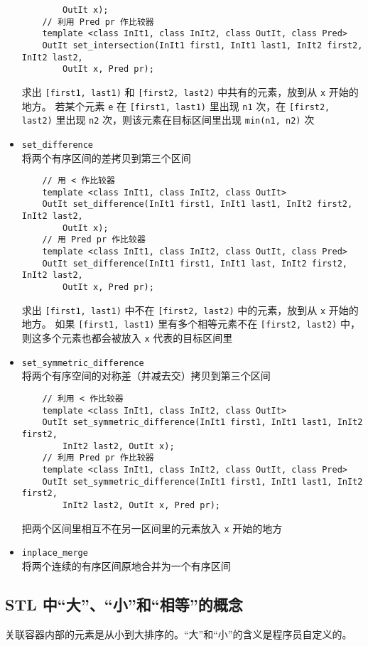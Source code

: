 \documentclass[UTF8]{ctexart}
\begin{document}
\begin{itemize}
\begin{verbatim}
        OutIt x);
    // 利用 Pred pr 作比较器
    template <class InIt1, class InIt2, class OutIt, class Pred>
    OutIt set_intersection(InIt1 first1, InIt1 last1, InIt2 first2, InIt2 last2,
        OutIt x, Pred pr);
    \end{verbatim}
    求出 \texttt{[first1, last1)} 和 \texttt{[first2, last2)} 中共有的元素，放到从 \texttt{x} 开始的地方。
    若某个元素 \texttt{e} 在 \texttt{[first1, last1)} 里出现 \texttt{n1} 次，在 \texttt{[first2, last2)}
    里出现 \texttt{n2} 次，则该元素在目标区间里出现 \texttt{min(n1, n2)} 次
    \item \texttt{set\_difference} \\
    将两个有序区间的差拷贝到第三个区间
    \begin{verbatim}
    // 用 < 作比较器
    template <class InIt1, class InIt2, class OutIt>
    OutIt set_difference(InIt1 first1, InIt1 last1, InIt2 first2, InIt2 last2,
        OutIt x);
    // 用 Pred pr 作比较器
    template <class InIt1, class InIt2, class OutIt, class Pred>
    OutIt set_difference(InIt1 first1, InIt1 last, InIt2 first2, InIt2 last2,
        OutIt x, Pred pr);
    \end{verbatim}
    求出 \texttt{[first1, last1)} 中不在 \texttt{[first2, last2)} 中的元素，放到从 \texttt{x} 开始的地方。
    如果 \texttt{[first1, last1)} 里有多个相等元素不在 \texttt{[first2, last2)} 中，则这多个元素也都会被放入
    \texttt{x} 代表的目标区间里
    \item \texttt{set\_symmetric\_difference} \\
    将两个有序空间的对称差（并减去交）拷贝到第三个区间
    \begin{verbatim}
    // 利用 < 作比较器
    template <class InIt1, class InIt2, class OutIt>
    OutIt set_symmetric_difference(InIt1 first1, InIt1 last1, InIt2 first2,
        InIt2 last2, OutIt x);
    // 利用 Pred pr 作比较器
    template <class InIt1, class InIt2, class OutIt, class Pred>
    OutIt set_symmetric_difference(InIt1 first1, InIt1 last1, InIt2 first2,
        InIt2 last2, OutIt x, Pred pr);
    \end{verbatim}
    把两个区间里相互不在另一区间里的元素放入 \texttt{x} 开始的地方
    \item \texttt{inplace\_merge} \\
    将两个连续的有序区间原地合并为一个有序区间
\end{itemize}



\subsection{STL 中“大”、“小”和“相等”的概念}
关联容器内部的元素是从小到大排序的。“大”和“小”的含义是程序员自定义的。
\end{document}

